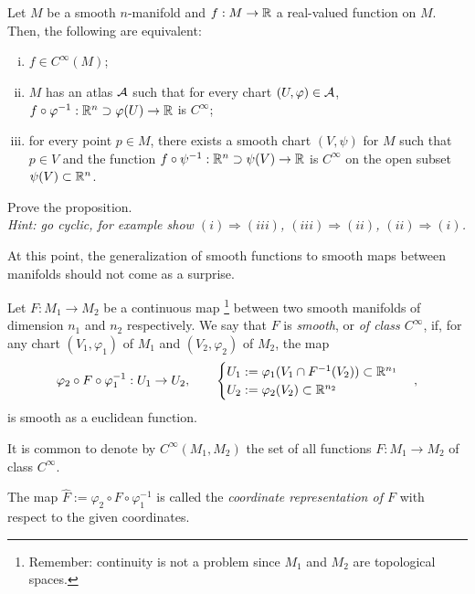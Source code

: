 \begin{proposition}
	Let $M$ be a smooth $n$-manifold and $f:M\to\mathbb{R}$ a real-valued function on $M$. Then, the following are equivalent:
	\begin{enumerate}[(i)]
		\item $f\in C^\infty(M)$;
		\item $M$ has an atlas $\mathcal{A}$ such that for every chart $(U, \varphi)\in\mathcal{A}$, $f\circ \varphi^{-1} : \mathbb{R}^n\supset\varphi(U)\to \mathbb{R}$ is $C^\infty$;
		\item for every point $p\in M$, there exists a smooth chart $(V,\psi)$ for $M$ such that $p\in V$ and the function $f\circ\psi^{-1} : \mathbb{R}^n\supset\psi(V)\to \mathbb{R}$ is $C^\infty$ on the open subset $\psi(V)\subset\mathbb{R}^n$.
	\end{enumerate}
\end{proposition}

\begin{exercise}
	Prove the proposition.\\
	\textit{\small Hint: go cyclic, for example show $(i)\Rightarrow(iii)$, $(iii)\Rightarrow(ii)$, $(ii)\Rightarrow(i)$.}
\end{exercise}

At this point, the generalization of smooth functions to smooth maps between manifolds should not come as a surprise.

\begin{definition}
	Let $F:M_1\to M_2$ be a continuous map \footnote{Remember: continuity is not a problem since $M_1$ and $M_2$ are topological spaces.} between two smooth manifolds of dimension $n_1$ and $n_2$ respectively.
	We say that $F$ is \emph{smooth}, or \emph{of class $C^\infty$}, if, for any chart $(V_1, \varphi_1)$ of $M_1$ and $(V_2, \varphi_2)$ of $M_2$, the map
	\begin{align}
		\varphi_2 \circ F \circ \varphi_1^{-1}: U_1 \to U_2,\qquad
		\begin{cases}
			U_1 := \varphi_1(V_1 \cap F^{-1}(V_2))\subset\mathbb{R}^{n_1} \\
			U_2 := \varphi_2(V_2)\subset\mathbb{R}^{n_2}
		\end{cases},
	\end{align}
	is smooth as a euclidean function.

	It is common to denote by $C^\infty(M_1, M_2)$ the set of all functions $F:M_1\to M_2$ of class $C^\infty$.

	The map $\hat F := \varphi_2 \circ F \circ \varphi_1^{-1}$ is called the \emph{coordinate representation of $F$} with respect to the given coordinates.
\end{definition}

